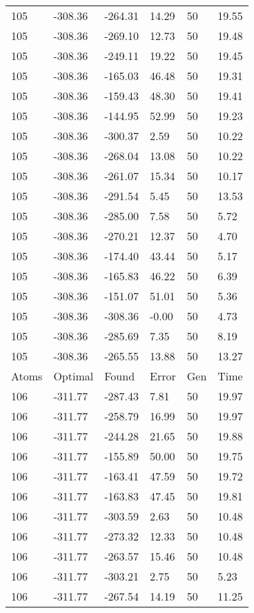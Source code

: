\documentclass{report}
\begin{document}
\begin{appendix}
\begin{longtable}{llllll}
105 & -308.36 & -264.31 & 14.29 & 50 & 19.55 \\
105 & -308.36 & -269.10 & 12.73 & 50 & 19.48 \\
105 & -308.36 & -249.11 & 19.22 & 50 & 19.45 \\
105 & -308.36 & -165.03 & 46.48 & 50 & 19.31 \\
105 & -308.36 & -159.43 & 48.30 & 50 & 19.41 \\
105 & -308.36 & -144.95 & 52.99 & 50 & 19.23 \\
105 & -308.36 & -300.37 & 2.59 & 50 & 10.22 \\
105 & -308.36 & -268.04 & 13.08 & 50 & 10.22 \\
105 & -308.36 & -261.07 & 15.34 & 50 & 10.17 \\
105 & -308.36 & -291.54 & 5.45 & 50 & 13.53 \\
105 & -308.36 & -285.00 & 7.58 & 50 & 5.72 \\
105 & -308.36 & -270.21 & 12.37 & 50 & 4.70 \\
105 & -308.36 & -174.40 & 43.44 & 50 & 5.17 \\
105 & -308.36 & -165.83 & 46.22 & 50 & 6.39 \\
105 & -308.36 & -151.07 & 51.01 & 50 & 5.36 \\
105 & -308.36 & -308.36 & -0.00 & 50 & 4.73 \\
105 & -308.36 & -285.69 & 7.35 & 50 & 8.19 \\
105 & -308.36 & -265.55 & 13.88 & 50 & 13.27 \\
Atoms & Optimal & Found & Error & Gen & Time \\
106 & -311.77 & -287.43 & 7.81 & 50 & 19.97 \\
106 & -311.77 & -258.79 & 16.99 & 50 & 19.97 \\
106 & -311.77 & -244.28 & 21.65 & 50 & 19.88 \\
106 & -311.77 & -155.89 & 50.00 & 50 & 19.75 \\
106 & -311.77 & -163.41 & 47.59 & 50 & 19.72 \\
106 & -311.77 & -163.83 & 47.45 & 50 & 19.81 \\
106 & -311.77 & -303.59 & 2.63 & 50 & 10.48 \\
106 & -311.77 & -273.32 & 12.33 & 50 & 10.48 \\
106 & -311.77 & -263.57 & 15.46 & 50 & 10.48 \\
106 & -311.77 & -303.21 & 2.75 & 50 & 5.23 \\
106 & -311.77 & -267.54 & 14.19 & 50 & 11.25 \\

\end{longtable}
\end{appendix}
\end{document}

